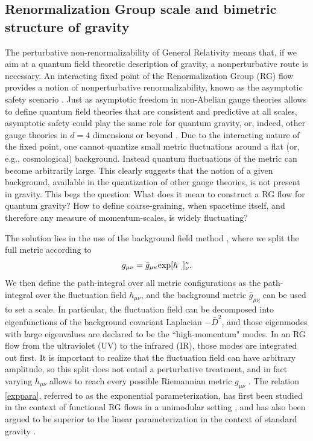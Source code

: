 \documentclass[twocolumn,prd,superscriptaddress,preprintnumbers,amsmath,amssymb,nofootinbib]{revtex4}
\newcommand{\be}{\begin{equation}}
\newcommand{\ee}{\end{equation}}
\begin{document}
\subsection{Renormalization Group scale and bimetric structure of gravity}
%
The perturbative non-renormalizability of General Relativity means that, 
if we aim at a quantum field theoretic description of gravity, a nonperturbative route is necessary. An interacting fixed point of the Renormalization Group (RG) flow provides a notion of nonperturbative renormalizability, known as the asymptotic safety scenario \cite{Weinberg:1980gg}. Just as asymptotic freedom in non-Abelian gauge theories allows to define quantum field theories that are consistent and predictive at all scales, asymptotic safety could play the same role for quantum gravity, or, indeed, other gauge theories in $d=4$ dimensions \cite{Litim:2014uca, Litim:2015iea} or beyond \cite{Gies:2003ic}. 
Due to the interacting nature of the fixed point, one cannot quantize small metric fluctuations around a flat (or, e.g., cosmological) background. Instead quantum fluctuations of the metric can become arbitrarily large. This clearly suggests that the notion of a given background, available in the quantization of other gauge theories, is not present in gravity. This begs the question: What does it mean to construct a RG flow for quantum gravity? How to define coarse-graining, when spacetime itself, and therefore any measure of momentum-scales, is widely fluctuating?


The solution lies in the use of the background field method \cite{Abbott:1980hw}, where we split the full metric according to
\be
g_{\mu \nu} = \bar{g}_{\mu \kappa} {\rm exp}[ h^{.}_{\,\,.}]^{\kappa}_{\nu}.\label{exppara}
\ee
We then define the path-integral over all metric configurations as the path-integral over the fluctuation field $h_{\mu \nu}$, and the background metric $\bar{g}_{\mu \nu}$ can be used to set a scale. In particular, the fluctuation field can be decomposed into eigenfunctions of the background covariant Laplacian $-\bar{D}^2$, and those eigenmodes with large eigenvalues are declared to be the ``high-momentum" modes. In an RG flow from the ultraviolet (UV) to the infrared (IR), those modes are integrated out first.
It is important to realize that the fluctuation field can have arbitrary amplitude, so this split does not entail a perturbative treatment, and in fact varying $h_{\mu \nu}$ allows to reach every possible Riemannian metric $g_{\mu \nu}$ \cite{Demmel:2015zfa}.
The relation \eqref{exppara}, referred to as the exponential parameterization, has first been studied in the context of functional RG flows in a unimodular setting \cite{Eichhorn:2013xr,Eichhorn:2015bna}, and has also been argued to be superior to the linear parameterization in the context of standard gravity \cite{Nink:2014yya,Percacci:2015wwa,Demmel:2015zfa, Labus:2015ska,Ohta:2015efa,Gies:2015tca}.
\end{document}
